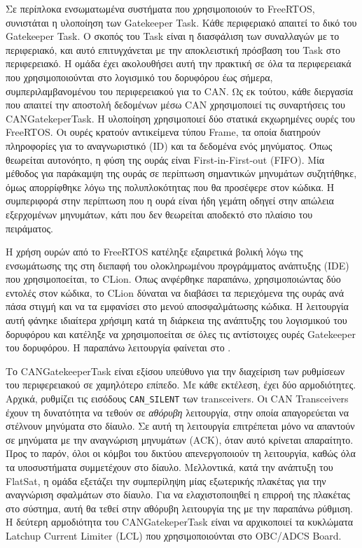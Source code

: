 \documentclass[a4paper,nobib,justified]{tufte-book}
\begin{document}
Σε περίπλοκα ενσωματωμένα συστήματα που χρησιμοποιούν το FreeRTOS, συνιστάται η υλοποίηση των Gatekeeper Task. Κάθε περιφεριακό απαιτεί το δικό του Gatekeeper Task. Ο σκοπός του Task είναι η διασφάλιση των συναλλαγών με το περιφεριακό, και αυτό επιτυγχάνεται με την αποκλειστική πρόσβαση του Task στο περιφερειακό. Η ομάδα έχει ακολουθήσει αυτή την πρακτική σε όλα τα περιφερειακά που χρησιμοποιούνται στο λογισμικό του δορυφόρου έως σήμερα, συμπεριλαμβανομένου του περιφερειακού για το CAN. Ως εκ τούτου, κάθε διεργασία που απαιτεί την αποστολή δεδομένων μέσω CAN χρησιμοποιεί τις συναρτήσεις του CANGatekeperTask. Η υλοποίηση χρησιμοποιεί δύο στατικά εκχωρημένες ουρές του FreeRTOS. Οι ουρές κρατούν αντικείμενα τύπου Frame, τα οποία διατηρούν πληροφορίες για το αναγνωριστικό (ID) και τα δεδομένα ενός μηνύματος. Όπως θεωρείται αυτονόητο, η φύση της ουράς είναι First-in-First-out (FIFO). Μία μέθοδος για παράκαμψη της ουράς σε περίπτωση σημαντικών μηνυμάτων συζητήθηκε, όμως απορρίφθηκε λόγω της πολυπλοκότητας που θα προσέφερε στον κώδικα. Η συμπεριφορά στην περίπτωση που η ουρά είναι ήδη γεμάτη οδηγεί στην απώλεια εξερχομένων μηνυμάτων, κάτι που δεν θεωρείται αποδεκτό στο πλαίσιο του πειράματος.

\par Η χρήση ουρών από το FreeRTOS κατέληξε εξαιρετικά βολική λόγω της ενσωμάτωσης της στη διεπαφή του ολοκληρωμένου προγράμματος ανάπτυξης (IDE) που χρησιμοποείται, το CLion. Όπως ανφέρθηκε παραπάνω, χρησιμοποιώντας δύο εντολές στον κώδικα, το CLion δύναται να διαβάσει τα περιεχόμενα της ουράς ανά πάσα στιγμή και να τα εμφανίσει στο μενού αποσφαλμάτωσης κώδικα. Η λειτουργία αυτή φάνηκε ιδιαίτερα χρήσιμη κατά τη διάρκεια της ανάπτυξης του λογισμικού του δορυφόρου και κατέληξε να χρησιμοποείται σε όλες τις αντίστοιχες ουρές Gatekeeper του δορυφόρου. Η παραπάνω λειτουργία φαίνεται στο .

\FloatBarrier

Το CANGatekeeperTask είναι εξίσου υπεύθυνο για την διαχείριση των ρυθμίσεων του περιφερειακού σε χαμηλότερο επίπεδο. Με κάθε εκτέλεση, έχει δύο αρμοδιότητες. Αρχικά, ρυθμίζει τις εισόδους \texttt{CAN\_SILENT} των transceivers. Οι CAN Transceivers έχουν τη δυνατότητα να τεθούν σε \textit{αθόρυβη} λειτουργία, στην οποία απαγορεύεται να στέλνουν μηνύματα στο δίαυλο. Σε αυτή τη λειτουργία επιτρέπεται μόνο να απαντούν σε μηνύματα με την αναγνώριση μηνυμάτων (ACK), όταν αυτό κρίνεται απαραίτητο. Προς το παρόν, όλοι οι κόμβοι του δικτύου απενεργοποιούν τη λειτουργία, καθώς όλα τα υποσυστήματα συμμετέχουν στο δίαυλο. Μελλοντικά, κατά την ανάπτυξη του FlatSat, η ομάδα εξετάζει την συμπερίληψη μίας εξωτερικής πλακέτας για την αναγνώριση σφαλμάτων στο δίαυλο. Για να ελαχιστοποιηθεί η επιρροή της πλακέτας στο σύστημα, αυτή θα τεθεί στην αθόρυβη λειτουργία της με την παραπάνω ρύθμιση. Η δεύτερη αρμοδιότητα του CANGatekeperTask είναι να αρχικοποιεί τα κυκλώματα Latchup Current Limiter (LCL) που χρησιμοποιούνται στο OBC/ADCS Board. 
\end{document}
